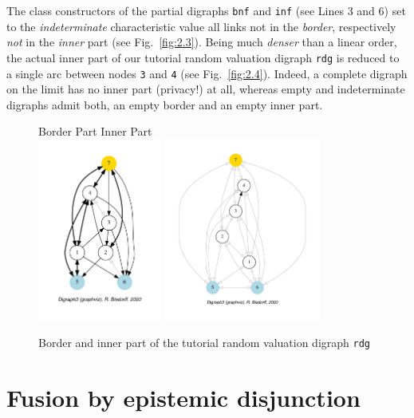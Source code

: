 The class constructors of the partial digraphs \texttt{bnf} and \texttt{inf}  (see Lines 3 and 6) set to the \emph{indeterminate} characteristic value all links not in the \emph{border}, respectively \emph{not} in the \emph{inner} part (see Fig.~\vref{fig:2.3}). Being much \emph{denser} than a linear order, the actual inner part of our tutorial random valuation digraph \texttt{rdg} is reduced to a single arc between nodes \texttt{3} and \texttt{4} (see Fig.~\vref{fig:2.4}). Indeed, a complete digraph on the limit has no inner part (privacy!) at all, whereas empty and indeterminate digraphs admit both, an empty border and an empty inner part.
\begin{figure}[h]
  Border Part \hfill Inner Part \\
  \includegraphics[height=6cm]{Figures/2-4-tutRandValDigraph_border.pdf}\hfill
  \includegraphics[height=6cm]{Figures/2-4-tutRandValDigraph_inner.pdf}\hfill
\caption{Border and inner part of the tutorial random valuation digraph \texttt{rdg}}
\label{fig:2.4}       %
\end{figure}

\section{Fusion by epistemic disjunction}
\label{sec:2.5}

